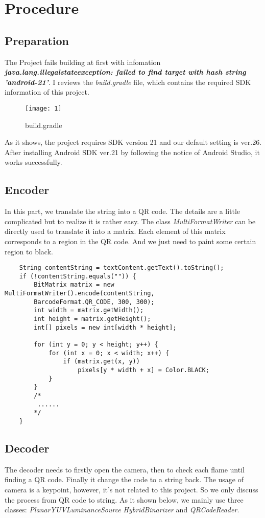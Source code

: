 \documentclass[12pt]{report}
\begin{document}
\section{Procedure}
\subsection{Preparation}
The Project fails building at first with infomation  \textbf{\textit{java.lang.illegalstateexception: failed to find target with hash string 'android-21'}}. I reviews the \textit{build.gradle} file, which contains the required SDK information of this project.
\begin{figure}[!htbp]
	\centering
	\texttt{[image: 1]}
	\caption{build.gradle}
	\label{fig:1}
\end{figure}

As it shows, the project requires SDK version 21 and our default setting is ver.26. After installing Android SDK ver.21 by following the notice of Android Studio, it works successfully.
\subsection{Encoder}
In this part, we translate the string into a QR code. The details are a little complicated but to realize it is rather easy. The class \textit{MultiFormatWriter} can be directly used to translate it into a matrix. Each element of this matrix corresponds to a region in the QR code. And we just need to paint some certain region to black.
\begin{lstlisting}
	String contentString = textContent.getText().toString();
	if (!contentString.equals("")) {
		BitMatrix matrix = new MultiFormatWriter().encode(contentString,
		BarcodeFormat.QR_CODE, 300, 300);
		int width = matrix.getWidth();
		int height = matrix.getHeight();
		int[] pixels = new int[width * height];
		
		for (int y = 0; y < height; y++) {
			for (int x = 0; x < width; x++) {
				if (matrix.get(x, y)) 
					pixels[y * width + x] = Color.BLACK;
			}
		}
		/*
		 ......
		*/
	}
\end{lstlisting}
\subsection{Decoder}
The decoder needs to firstly open the camera, then to check each flame until finding a QR code. Finally it change the code to a string back. The usage of camera is a keypoint, however, it's not related to this project. So we only discuss the process from QR code to string. As it shown below, we mainly use three classes: \textit{PlanarYUVLuminanceSource} \textit{HybridBinarizer} and \textit{QRCodeReader}.
\end{document}
